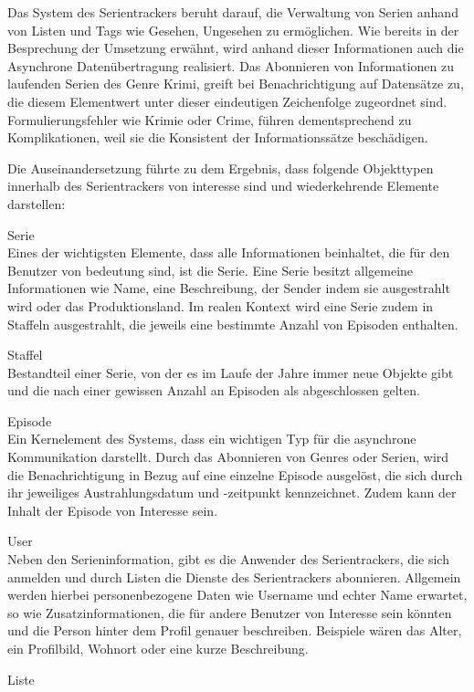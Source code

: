 \documentclass[a4paper]{article}
\begin{document}
Das System des Serientrackers beruht darauf, die Verwaltung von Serien anhand von Listen und Tags wie
Gesehen, Ungesehen zu ermöglichen. Wie bereits in der Besprechung der Umsetzung erwähnt, wird anhand
dieser Informationen auch die Asynchrone Datenübertragung realisiert.
Das Abonnieren von Informationen zu laufenden Serien des Genre Krimi, greift bei Benachrichtigung auf
Datensätze zu, die diesem Elementwert unter dieser eindeutigen Zeichenfolge zugeordnet sind. Formulierungsfehler
wie Krimie oder Crime, führen dementsprechend zu Komplikationen, weil sie die Konsistent der Informationssätze beschädigen.

Die Auseinandersetzung führte zu dem Ergebnis, dass folgende Objekttypen innerhalb des Serientrackers von interesse sind und wiederkehrende Elemente darstellen:

Serie \\
Eines der wichtigsten Elemente, dass alle Informationen beinhaltet, die für den Benutzer von bedeutung sind, ist die Serie. 
Eine Serie besitzt allgemeine Informationen wie Name, eine Beschreibung, der Sender indem sie ausgestrahlt wird oder das Produktionsland.
Im realen Kontext wird eine Serie zudem in Staffeln ausgestrahlt, die jeweils eine bestimmte Anzahl von Episoden enthalten.

Staffel \\
Bestandteil einer Serie, von der es im Laufe der Jahre immer neue Objekte gibt und die nach einer gewissen Anzahl an Episoden als abgeschlossen gelten.

Episode \\
Ein Kernelement des Systems, dass ein wichtigen Typ für die asynchrone Kommunikation darstellt. Durch das Abonnieren von Genres oder Serien, wird die Benachrichtigung in Bezug auf eine einzelne Episode ausgelöst, die sich durch ihr jeweiliges Austrahlungsdatum und -zeitpunkt kennzeichnet. 
Zudem kann der Inhalt der Episode von Interesse sein.

User \\
Neben den Serieninformation, gibt es die Anwender des Serientrackers, die sich anmelden und durch Listen die Dienste des Serientrackers abonnieren.
Allgemein werden hierbei personenbezogene Daten wie Username und echter Name erwartet, so wie Zusatzinformationen, die für andere Benutzer von Interesse sein könnten und die Person hinter dem Profil genauer beschreiben. Beispiele wären das Alter, ein Profilbild, Wohnort oder eine kurze Beschreibung.

Liste \\
\end{document}
